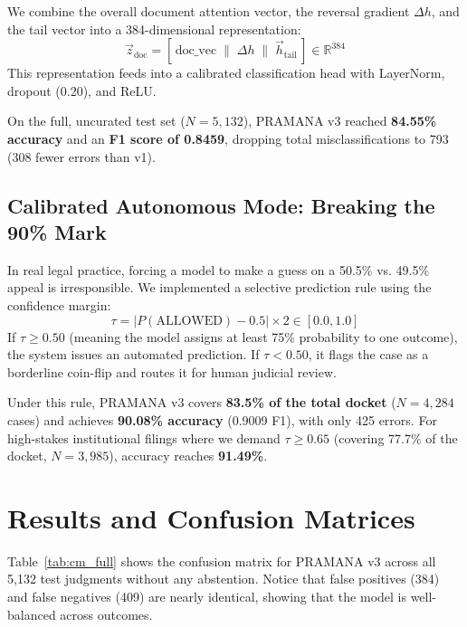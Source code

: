 \documentclass[11pt,a4paper]{article}
\begin{document}
We combine the overall document attention vector, the reversal gradient $\Delta h$, and the tail vector into a 384-dimensional representation:
\begin{equation}
\vec{z}_{\text{doc}} = [\, \text{doc\_vec} \;\|\; \Delta h \;\|\; \vec{h}_{\text{tail}} \,] \in \mathbb{R}^{384}
\end{equation}
This representation feeds into a calibrated classification head with LayerNorm, dropout (0.20), and ReLU. 

On the full, uncurated test set ($N = 5,132$), PRAMANA v3 reached \textbf{84.55\% accuracy} and an \textbf{F1 score of 0.8459}, dropping total misclassifications to 793 (308 fewer errors than v1).

\subsection{Calibrated Autonomous Mode: Breaking the 90\% Mark}
In real legal practice, forcing a model to make a guess on a 50.5\% vs. 49.5\% appeal is irresponsible. We implemented a selective prediction rule using the confidence margin:
\begin{equation}
\tau = |P(\text{ALLOWED}) - 0.5| \times 2 \in [0.0, 1.0]
\end{equation}
If $\tau \ge 0.50$ (meaning the model assigns at least 75\% probability to one outcome), the system issues an automated prediction. If $\tau < 0.50$, it flags the case as a borderline coin-flip and routes it for human judicial review.

Under this rule, PRAMANA v3 covers \textbf{83.5\% of the total docket} ($N = 4,284$ cases) and achieves \textbf{90.08\% accuracy} (0.9009 F1), with only 425 errors. For high-stakes institutional filings where we demand $\tau \ge 0.65$ (covering 77.7\% of the docket, $N = 3,985$), accuracy reaches \textbf{91.49\%}.

\section{Results and Confusion Matrices}
Table~\ref{tab:cm_full} shows the confusion matrix for PRAMANA v3 across all 5,132 test judgments without any abstention. Notice that false positives (384) and false negatives (409) are nearly identical, showing that the model is well-balanced across outcomes.
\end{document}
